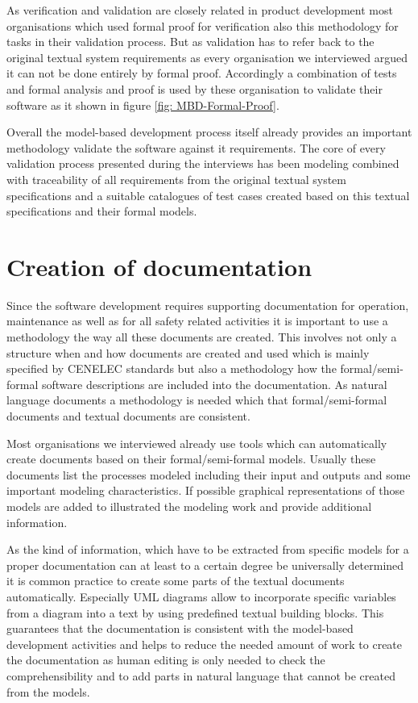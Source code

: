\documentclass{./template/openetcs_report}
\begin{document}
As verification and validation are closely related in product development most organisations which used formal proof for verification also this methodology for tasks in their validation process. But as validation has to refer back to the original textual system requirements as every organisation we interviewed argued it can not be done entirely by formal proof. Accordingly a combination of tests and formal analysis and proof is used by these organisation to validate their software as it shown in figure \ref{fig: MBD-Formal-Proof}. 

Overall the model-based development process itself already provides an important methodology validate the software against it requirements. The core of every validation process presented during the interviews has been modeling combined with traceability of all requirements from the original textual system specifications and a suitable catalogues of test cases created based on this textual specifications and their formal models.

\section{Creation of documentation}

Since the software development requires supporting documentation for operation, maintenance as well as for all safety related activities it is important to use a methodology the way all these documents are created. This involves not only a structure when and how documents are created and used which is mainly specified by CENELEC standards but also a methodology how the formal/semi-formal software descriptions are included into the documentation. As natural language documents a methodology is needed which that formal/semi-formal documents and textual documents are consistent.

Most organisations we interviewed already use tools which can automatically create documents based on their formal/semi-formal models. Usually these documents list the processes modeled including their input and outputs and some important modeling characteristics. If possible graphical representations of those models are added to illustrated the modeling work and provide additional information.

As the kind of information, which have to be extracted from specific models for a proper documentation can at least to a certain degree be universally determined it is common practice to 
create some parts of the textual documents automatically. Especially UML diagrams allow to incorporate specific variables from a diagram into a text by using predefined textual building blocks. This guarantees that the documentation is consistent with the model-based development activities and helps to reduce the needed amount of work to create the documentation as human editing is only needed to check the comprehensibility and to add parts in natural language that cannot be created from the models.
\end{document}
